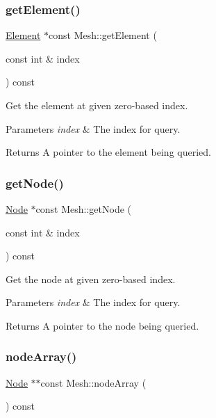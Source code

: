 \subsubsection{\texorpdfstring{get\+Element()}{getElement()}}
{\footnotesize\ttfamily \mbox{\hyperlink{class_element}{Element}} $\ast$const Mesh\+::get\+Element (\begin{DoxyParamCaption}\item[{const int \&}]{index }\end{DoxyParamCaption}) const}



Get the element at given zero-\/based index. 


\begin{DoxyParams}{Parameters}
{\em index} & The index for query. \\
\hline
\end{DoxyParams}
\begin{DoxyReturn}{Returns}
A pointer to the element being queried. 
\end{DoxyReturn}
\mbox{\label{class_mesh_a071a8dfe15c00fcabc9c4071306487d4}} 
\subsubsection{\texorpdfstring{get\+Node()}{getNode()}}
{\footnotesize\ttfamily \mbox{\hyperlink{class_node}{Node}} $\ast$const Mesh\+::get\+Node (\begin{DoxyParamCaption}\item[{const int \&}]{index }\end{DoxyParamCaption}) const}



Get the node at given zero-\/based index. 


\begin{DoxyParams}{Parameters}
{\em index} & The index for query. \\
\hline
\end{DoxyParams}
\begin{DoxyReturn}{Returns}
A pointer to the node being queried. 
\end{DoxyReturn}
\mbox{\label{class_mesh_ae596a597115563fb308d99e5e15a62e6}} 
\subsubsection{\texorpdfstring{node\+Array()}{nodeArray()}}
{\footnotesize\ttfamily \mbox{\hyperlink{class_node}{Node}} $\ast$$\ast$const Mesh\+::node\+Array (\begin{DoxyParamCaption}{ }\end{DoxyParamCaption}) const}



